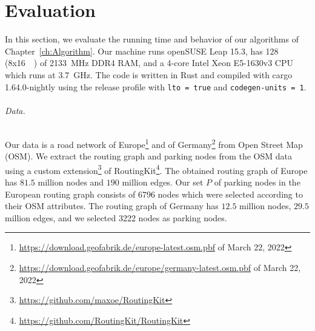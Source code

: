 
\chapter{Evaluation\label{ch:Evaluation}}
In this section, we evaluate the running time and behavior of our algorithms of Chapter~\ref{ch:Algorithm}. Our machine runs openSUSE Leap 15.3, has \SI{128}{\giga\byte} (8x\SI{16}{\giga\byte}) of \SI{2133}{\mega\hertz} DDR4 RAM, and a 4-core Intel Xeon E5-1630v3 CPU which runs at \SI{3.7}{\giga\hertz}. The code is written in Rust and compiled with cargo 1.64.0-nightly using the release profile with \texttt{lto~=~true} and \texttt{codegen-units~=~1}.

\subparagraph{Data.} Our data is a road network of Europe\footnote{\url{https://download.geofabrik.de/europe-latest.osm.pbf} of March 22, 2022} and of Germany\footnote{\url{https://download.geofabrik.de/europe/germany-latest.osm.pbf} of March 22, 2022} from Open Street Map (OSM). We extract the routing graph and parking nodes from the OSM data using a custom extension\footnote{\url{https://github.com/maxoe/RoutingKit}} of RoutingKit\footnote{\url{https://github.com/RoutingKit/RoutingKit}}. The obtained routing graph of Europe has $81.5$ million nodes and $190$ million edges. Our set $P$ of parking nodes in the European routing graph consists of \num{6796} nodes which were selected according to their OSM attributes. The routing graph of Germany has $12.5$ million nodes, $29.5$ million edges, and we selected \num{3222} nodes as parking nodes.

